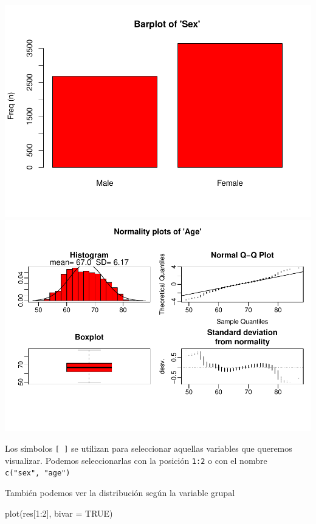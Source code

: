 \documentclass[
]{book}
\newenvironment{Shaded}{\begin{snugshade}}{\end{snugshade}}
\newcommand{\AttributeTok}[1]{\textcolor[rgb]{0.77,0.63,0.00}{#1}}
\newcommand{\ConstantTok}[1]{\textcolor[rgb]{0.00,0.00,0.00}{#1}}
\newcommand{\DecValTok}[1]{\textcolor[rgb]{0.00,0.00,0.81}{#1}}
\newcommand{\FunctionTok}[1]{\textcolor[rgb]{0.00,0.00,0.00}{#1}}
\newcommand{\NormalTok}[1]{#1}
\newcommand{\SpecialCharTok}[1]{\textcolor[rgb]{0.00,0.00,0.00}{#1}}
\begin{document}
\includegraphics{fig/unnamed-chunk-127-1.pdf} \includegraphics{fig/unnamed-chunk-127-2.pdf}

Los símbolos \texttt{{[}\ {]}} se utilizan para seleccionar aquellas variables que queremos visualizar. Podemos seleccionarlas con la posición \texttt{1:2} o con el nombre \texttt{c("sex",\ "age")}

También podemos ver la distribución según la variable grupal

\begin{Shaded}
\begin{Highlighting}[]
\FunctionTok{plot}\NormalTok{(res[}\DecValTok{1}\SpecialCharTok{:}\DecValTok{2}\NormalTok{], }\AttributeTok{bivar =} \ConstantTok{TRUE}\NormalTok{)}
\end{Highlighting}
\end{Shaded}
\end{document}
